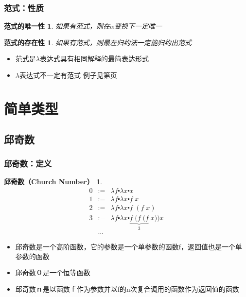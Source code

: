 \documentclass[CJKutf8,compress,hyperref]{beamer}
\begin{document}
\begin{CJK}{UTF8}{song}
\begin{frame}
  \frametitle{范式：性质} 
  \newtheorem{Parad_uniq}{范式的唯一性} 
  \begin{Parad_uniq}
    如果有范式，则在$\alpha$变换下一定唯一 
  \end{Parad_uniq}
  \newtheorem{Parad_exist}{范式的存在性} 
  \begin{Parad_exist}
    如果有范式，则最左归约法一定能归约出范式 
  \end{Parad_exist}
  \begin{itemize}
  \item 范式是$\lambda$表达式具有相同解释的最简表达形式 
  \item $\lambda$表达式不一定有范式 例子见第\pageref{ambig}页
  \end{itemize}
\end{frame} 

\section{简单类型}

\subsection{邱奇数}
\begin{frame}
  \frametitle{邱奇数：定义}
  \newtheorem{churchNo}{邱奇数（Church Number）} 
  \begin{churchNo}
    \begin{eqnarray*}
      0 & := & \lambda f \centerdot \lambda x \centerdot x \\ 
      1 & := & \lambda f \centerdot \lambda x \centerdot f \; x \\ 
      2 & := & \lambda f \centerdot \lambda x \centerdot f \; (f \;x) \\ 
      3 & := & \lambda f \centerdot \lambda x \centerdot \underbrace{f \; (f \; (f}_3 \;x))x \\ 
        & \dots &  
    \end{eqnarray*}  
  \end{churchNo}
  \begin{itemize}
  \item 邱奇数是一个高阶函数，它的参数是一个单参数的函数f，返回值也是一个单参数的函数
  \item 邱奇数０是一个恒等函数
  \item 邱奇数ｎ是以函数ｆ作为参数并以f的n次复合调用的函数作为返回值的函数
  \end{itemize}
\end{frame} 


\end{CJK}
\end{document}
